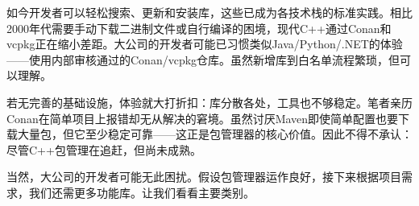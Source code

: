如今开发者可以轻松搜索、更新和安装库，这些已成为各技术栈的标准实践。相比2000年代需要手动下载二进制文件或自行编译的困境，现代C++通过Conan和vcpkg正在缩小差距。大公司的开发者可能已习惯类似Java/Python/.NET的体验——使用内部审核通过的Conan/vcpkg仓库。虽然新增库到白名单流程繁琐，但可以理解。

若无完善的基础设施，体验就大打折扣：库分散各处，工具也不够稳定。笔者亲历Conan在简单项目上报错却无从解决的窘境。虽然讨厌Maven即使简单配置也要下载大量包，但它至少稳定可靠——这正是包管理器的核心价值。因此不得不承认：尽管C++包管理在追赶，但尚未成熟。

当然，大公司的开发者可能无此困扰。假设包管理器运作良好，接下来根据项目需求，我们还需更多功能库。让我们看看主要类别。




